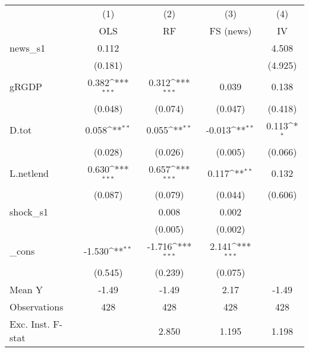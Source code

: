 {
\def\sym#1{\ifmmode^{#1}\else\(^{#1}\)\fi}
\begin{tabular}{l*{4}{c}}
\toprule
            &\multicolumn{1}{c}{(1)}&\multicolumn{1}{c}{(2)}&\multicolumn{1}{c}{(3)}&\multicolumn{1}{c}{(4)}\\
            &\multicolumn{1}{c}{OLS}&\multicolumn{1}{c}{RF}&\multicolumn{1}{c}{FS (news)}&\multicolumn{1}{c}{IV}\\
\midrule
news\_s1     &       0.112         &                     &                     &       4.508         \\
            &     (0.181)         &                     &                     &     (4.925)         \\
\addlinespace
gRGDP       &       0.382\sym{***}&       0.312\sym{***}&       0.039         &       0.138         \\
            &     (0.048)         &     (0.074)         &     (0.047)         &     (0.418)         \\
\addlinespace
D.tot       &       0.058\sym{**} &       0.055\sym{**} &      -0.013\sym{**} &       0.113\sym{*}  \\
            &     (0.028)         &     (0.026)         &     (0.005)         &     (0.066)         \\
\addlinespace
L.netlend   &       0.630\sym{***}&       0.657\sym{***}&       0.117\sym{**} &       0.132         \\
            &     (0.087)         &     (0.079)         &     (0.044)         &     (0.606)         \\
\addlinespace
shock\_s1    &                     &       0.008         &       0.002         &                     \\
            &                     &     (0.005)         &     (0.002)         &                     \\
\addlinespace
\_cons      &      -1.530\sym{**} &      -1.716\sym{***}&       2.141\sym{***}&                     \\
            &     (0.545)         &     (0.239)         &     (0.075)         &                     \\
\midrule
Mean Y      &       -1.49         &       -1.49         &        2.17         &       -1.49         \\
Observations&         428         &         428         &         428         &         428         \\
Exc. Inst. F-stat&                     &       2.850         &       1.195         &       1.198         \\
\bottomrule
\end{tabular}
}
